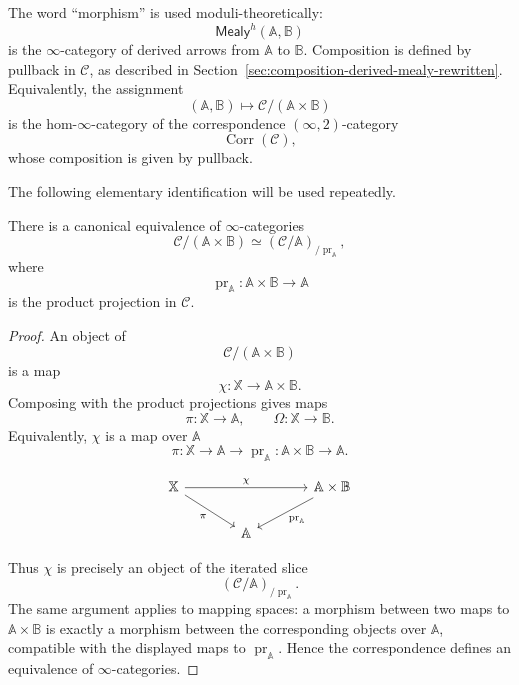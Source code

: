 \begin{remark}
\label{rem:derived-morphism-moduli-theoretic-rewritten}
The word ``morphism'' is used moduli-theoretically:
\[
\mathsf{Mealy}^h(\mathbb A,\mathbb B)
\]
is the \(\infty\)-category of derived arrows from \(\mathbb A\) to
\(\mathbb B\). Composition is defined by pullback in
\(\mathcal C\), as described in
Section~\ref{sec:composition-derived-mealy-rewritten}.
Equivalently, the assignment
\[
(\mathbb A,\mathbb B)
\longmapsto
\mathcal C/(\mathbb A\times\mathbb B)
\]
is the hom-\(\infty\)-category of the correspondence
\((\infty,2)\)-category
\[
\operatorname{Corr}(\mathcal C),
\]
whose composition is given by pullback.
\end{remark}

The following elementary identification will be used repeatedly.

\begin{proposition}
\label{prop:mealy-as-iterated-slice}
There is a canonical equivalence of \(\infty\)-categories
\[
\mathcal C/(\mathbb A\times\mathbb B)
\simeq
(\mathcal C/\mathbb A)_{/\operatorname{pr}_{\mathbb A}},
\]
where
\[
\operatorname{pr}_{\mathbb A}:
\mathbb A\times\mathbb B\to\mathbb A
\]
is the product projection in \(\mathcal C\).
\end{proposition}

\begin{proof}
An object of
\[
\mathcal C/(\mathbb A\times\mathbb B)
\]
is a map
\[
\chi:\mathbb X\to\mathbb A\times\mathbb B.
\]
Composing with the product projections gives maps
\[
\pi:\mathbb X\to\mathbb A,
\qquad
\Omega:\mathbb X\to\mathbb B.
\]
Equivalently, \(\chi\) is a map over \(\mathbb A\)
\[
\pi:\mathbb X\to\mathbb A
\longrightarrow
\operatorname{pr}_{\mathbb A}:\mathbb A\times\mathbb B\to\mathbb A.
\]

\[
\begin{tikzcd}[column sep=large]
\mathbb X
\arrow[rr, "\chi"]
\arrow[dr, "\pi"']
&
&
\mathbb A\times\mathbb B
\arrow[dl, "\operatorname{pr}_{\mathbb A}"]
\\
&
\mathbb A
&
\end{tikzcd}
\]

Thus \(\chi\) is precisely an object of the iterated slice
\[
(\mathcal C/\mathbb A)_{/\operatorname{pr}_{\mathbb A}}.
\]
The same argument applies to mapping spaces: a morphism between two maps
to \(\mathbb A\times\mathbb B\) is exactly a morphism between the
corresponding objects over \(\mathbb A\), compatible with the displayed
maps to \(\operatorname{pr}_{\mathbb A}\). Hence the correspondence
defines an equivalence of \(\infty\)-categories.
\end{proof}

